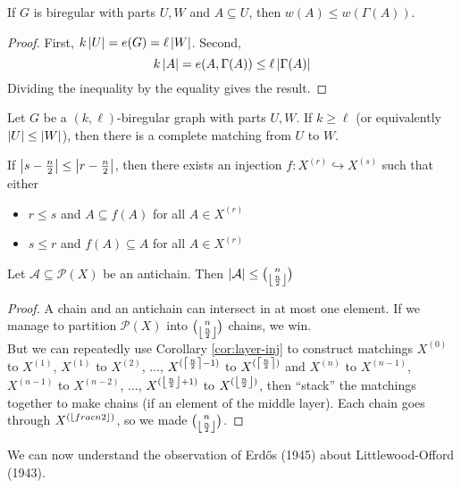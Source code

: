 \documentclass{article}
\begin{document}
\begin{nlemma}
  If $G$ is biregular with parts $U, W$ and $A \subseteq U$, then $w(A) \le w(\Gamma(A))$.
\end{nlemma}
\begin{proof}
  First, $k\left\lvert U\right\rvert = e(G) = \ell\left\lvert W\right\rvert$. Second,
  $$k\left\lvert A\right\rvert = e(A, \Gamma(A)) \le \ell\left\lvert \Gamma(A)\right\rvert$$
  Dividing the inequality by the equality gives the result.
\end{proof}

\newlec

\begin{ncor}
  Let $G$  be a $(k, \ell)$-biregular graph with parts $U, W$. If $k \ge \ell$ (or equivalently $\left\lvert U\right\rvert \le \left\lvert W\right\rvert$), then there is a complete matching from $U$ to $W$.
\end{ncor}

\begin{ncor}\label{cor:layer-inj}
  If $\left\lvert s - \frac n 2\right\rvert \le \left\lvert r - \frac n 2\right\rvert$, then there exists an injection $f : X^{(r)} \hookrightarrow X^{(s)}$ such that either
  \begin{itemize}
    \item $r \le s$ and $A \subseteq f(A)$ for all $A \in X^{(r)}$
    \item $s \le r$ and $f(A) \subseteq A$ for all $A \in X^{(r)}$
  \end{itemize}
\end{ncor}

\begin{nthm}[Sperner, 1928]
  Let $\mathcal A \subseteq \mathcal P(X)$ be an antichain. Then $\left\lvert \mathcal A\right\rvert \le \binom n{\left\lfloor \frac n 2\right\rfloor}$
\end{nthm}
\begin{proof}
  A chain and an antichain can intersect in at most one element. If we manage to partition $\mathcal P(X)$ into $\binom n{\left\lfloor \frac n 2\right\rfloor}$ chains, we win. \\
  But we can repeatedly use Corollary \ref{cor:layer-inj} to construct matchings $X^{(0)}$ to $X^{(1)}$, $X^{(1)}$ to $X^{(2)}$, ..., $X^{(\left\lceil \frac n 2\right\rceil - 1)}$ to $X^{(\left\lceil \frac n 2\right\rceil)}$ and $X^{(n)}$ to $X^{(n - 1)}$, $X^{(n - 1)}$ to $X^{(n - 2)}$, ..., $X^{(\left\lfloor \frac n 2\right\rfloor + 1)}$ to $X^{(\left\lfloor \frac n 2\right\rfloor)}$, then ``stack'' the matchings together to make chains (if an element of the middle layer). Each chain goes through $X^{(\left\lfloor frac n 2\right\rfloor)}$, so we made $\binom n {\left\lfloor \frac n 2\right\rfloor}$.
\end{proof}

We can now understand the observation of Erd\H os (1945) about Littlewood-Offord (1943).
\end{document}
